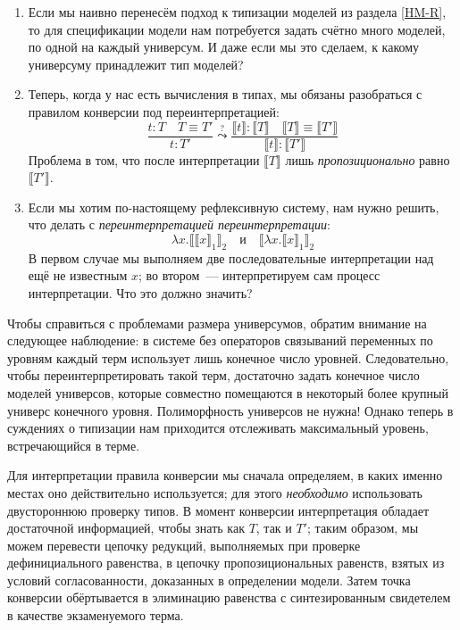 \begin{enumerate}
    \item Если мы наивно перенесём подход к типизации
        моделей из раздела \ref{HM-R}, то для
        спецификации модели нам потребуется задать
        счётно много моделей, по одной на каждый
        универсум. И даже если мы это сделаем, к какому
        универсуму принадлежит тип моделей?
    \item Теперь, когда у нас есть вычисления в типах,
        мы обязаны разобраться с правилом конверсии под
        переинтерпретацией:
        \[
            \dfrac{t:T\quad T\equiv T'}{t:T'}
            \stackrel{?}{\leadsto}
            \dfrac{\llbracket t\rrbracket:\llbracket T
                \rrbracket\quad
                \llbracket T\rrbracket\equiv
                \llbracket T'\rrbracket
            }{\llbracket t\rrbracket:
                \llbracket T'\rrbracket}
        \]
        Проблема в том, что после интерпретации
        $\llbracket T\rrbracket$ лишь
        \textit{пропозиционально} равно
        $\llbracket T'\rrbracket$.
    \item Если мы хотим по-настоящему рефлексивную
        систему, нам нужно решить, что делать с
        \textit{переинтерпретацией переинтерпретации}:
        \[
            \lambda x.\llbracket\llbracket
                x\rrbracket_1\rrbracket_2
            \quad\text{и}\quad
            \llbracket\lambda x.\llbracket x
                \rrbracket_1\rrbracket_2
        \]
        В первом случае мы выполняем две
        последовательные интерпретации над ещё не
        известным $x$; во втором~--- интерпретируем сам
        процесс интерпретации. Что это должно значить?
\end{enumerate}

Чтобы справиться с проблемами размера универсумов,
обратим внимание на следующее наблюдение: в системе без
операторов связываний переменных по уровням каждый терм
использует лишь конечное число уровней. Следовательно,
чтобы переинтерпретировать такой терм, достаточно
задать конечное число моделей универсов, которые
совместно помещаются в некоторый более крупный универс
конечного уровня. Полиморфность универсов не нужна!
Однако теперь в суждениях о типизации нам приходится
отслеживать максимальный уровень, встречающийся в
терме.

Для интерпретации правила конверсии мы сначала
определяем, в каких именно местах оно действительно
используется; для этого \textit{необходимо}
использовать двустороннюю проверку типов. В момент
конверсии интерпретация обладает достаточной
информацией, чтобы знать как $T$, так и $T'$; таким
образом, мы можем перевести цепочку редукций,
выполняемых при проверке дефинициального равенства, в
цепочку пропозициональных равенств, взятых из условий
согласованности, доказанных в определении модели. Затем
точка конверсии обёртывается в элиминацию равенства с
синтезированным свидетелем в качестве экзаменуемого
терма.

